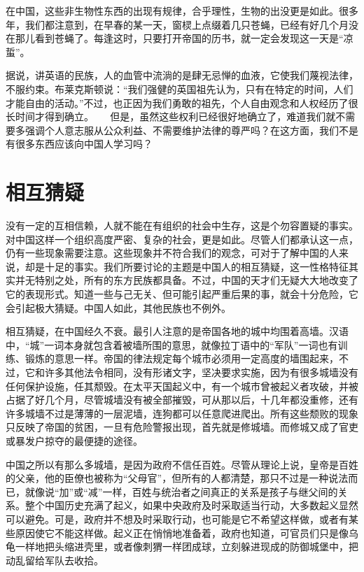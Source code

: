 \documentclass[12pt,oneside]{book}
\begin{document}
\begin{common-format}
在中国，这些非生物性东西的出现有规律，合乎理性，生物的出没更是如此。很多年，我们都注意到，在早春的某一天，窗棂上点缀着几只苍蝇，已经有好几个月没在那儿看到苍蝇了。每逢这时，只要打开帝国的历书，就一定会发现这一天是“凉蜇”。 

据说，讲英语的民族，人的血管中流淌的是肆无忌惮的血液，它使我们蔑视法律，不服约束。布莱克斯顿说：“我们强健的英国祖先认为，只有在特定的时间，人们才能自由的活动。”不过，也正因为我们勇敢的祖先，个人自由观念和人权经历了很长时间才得到确立。 
　
但是，虽然这些权利已经很好地确立了，难道我们就不需要多强调个人意志服从公众利益、不需要维护法律的尊严吗？在这方面，我们不是有很多东西应该向中国人学习吗？ 

\chapter{相互猜疑}
没有一定的互相信赖，人就不能在有组织的社会中生存，这是个勿容置疑的事实。对中国这样一个组织高度严密、复杂的社会，更是如此。尽管人们都承认这一点，仍有一些现象需要注意。这些现象并不符合我们的观念，可对于了解中国的人来说，却是十足的事实。我们所要讨论的主题是中国人的相互猜疑，这一性格特征其实并无特别之处，所有的东方民族都具备。不过，中国的天才们无疑大大地改变了它的表现形式。知道一些与己无关、但可能引起严重后果的事，就会十分危险，它会引起极大猜疑。中国人如此，其他民族也不例外。 

相互猜疑，在中国经久不衰。最引人注意的是帝国各地的城中均围着高墙。汉语中，“城”一词本身就包含着被墙所围的意思，就像拉丁语中的“军队”一词也有训练、锻炼的意思一样。帝国的律法规定每个城市必须用一定高度的墙围起来，不过，它和许多其他法令相同，没有形诸文字，坚决要求实施，因为有很多城墙没有任何保护设施，任其颓毁。在太平天国起义中，有一个城市曾被起义者攻破，并被占据了好几个月，尽管城墙没有被全部摧毁，可从那以后，十几年都没重修，还有许多城墙不过是薄薄的一层泥墙，连狗都可以任意爬进爬出。所有这些颓败的现象只反映了帝国的贫困，一旦有危险警报出现，首先就是修城墙。而修城又成了官吏或暴发户掠夺的最便捷的途径。 

中国之所以有那么多城墙，是因为政府不信任百姓。尽管从理论上说，皇帝是百姓的父亲，他的臣僚也被称为“父母官”，但所有的人都清楚，那只不过是一种说法而已，就像说“加”或“减”一样，百姓与统治者之间真正的关系是孩子与继父间的关系。整个中国历史充满了起义，如果中央政府及时采取适当行动，大多数起义显然可以避免。可是，政府并不想及时采取行动，也可能是它不希望这样做，或者有某些原因使它不能这样做。起义正在悄悄地准备着，政府也知道，可官员们只是像乌龟一样地把头缩进壳里，或者像刺猬一样团成球，立刻躲进现成的防御城堡中，把动乱留给军队去收拾。 


\end{common-format}
\end{document}
